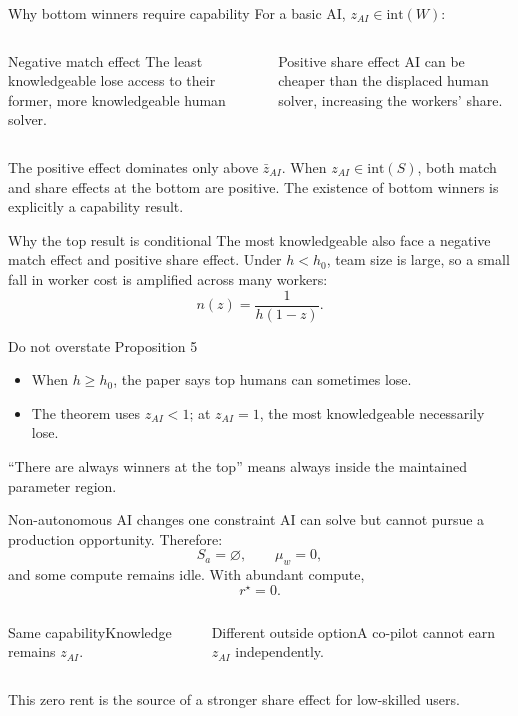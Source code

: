 \documentclass[aspectratio=169,10pt]{beamer}
\begin{document}
\begin{frame}{Why bottom winners require capability}
\small
For a basic AI, $z_{AI}\in\mathrm{int}(W)$:
\begin{columns}[T,onlytextwidth]
\begin{alertblock}{Negative match effect}
The least knowledgeable lose access to their former, more knowledgeable human solver.
\end{alertblock}
\begin{block}{Positive share effect}
AI can be cheaper than the displaced human solver, increasing the workers' share.
\end{block}
\end{columns}
\vspace{.3cm}
The positive effect dominates only above $\bar z_{AI}$. When $z_{AI}\in\mathrm{int}(S)$, both match and share effects at the bottom are positive.
\vfill
\centering{}\quad The existence of bottom winners is explicitly a capability result.
\end{frame}

\begin{frame}{Why the top result is conditional}
\small
The most knowledgeable also face a negative match effect and positive share effect. Under $h<h_0$, team size is large, so a small fall in worker cost is amplified across many workers:
\[
n(z)=\frac{1}{h(1-z)}.
\]
\begin{alertblock}{Do not overstate Proposition 5}
\begin{itemize}
\item When $h\ge h_0$, the paper says top humans can sometimes lose.
\item The theorem uses $z_{AI}<1$; at $z_{AI}=1$, the most knowledgeable necessarily lose.
\end{itemize}
\end{alertblock}
“There are always winners at the top” means always inside the maintained parameter region.
\end{frame}

\begin{frame}{Non-autonomous AI changes one constraint}
\small
AI can solve but cannot pursue a production opportunity. Therefore:
\[
S_a=\varnothing,\qquad \mu_w=0,
\]
and some compute remains idle. With abundant compute,
\[
\boxed{r^\star=0}.
\]
\begin{columns}[T,onlytextwidth]
\begin{block}{Same capability}Knowledge remains $z_{AI}$.\end{block}
\begin{alertblock}{Different outside option}A co-pilot cannot earn $z_{AI}$ independently.\end{alertblock}
\end{columns}
This zero rent is the source of a stronger share effect for low-skilled users.
\end{frame}
\end{document}

